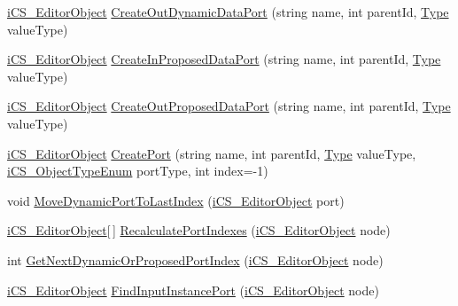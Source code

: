 \begin{DoxyCompactItemize}
\item 
\hyperlink{classi_c_s___editor_object}{i\+C\+S\+\_\+\+Editor\+Object} \hyperlink{classi_c_s___i_storage_a78035f0beb55b7498d9466bbfbcc317b}{Create\+Out\+Dynamic\+Data\+Port} (string name, int parent\+Id, \hyperlink{i_c_s___object_type_enum_8cs_ae6c3dd6d8597380b56d94908eb431547aa1fa27779242b4902f7ae3bdd5c6d508}{Type} value\+Type)
\item 
\hyperlink{classi_c_s___editor_object}{i\+C\+S\+\_\+\+Editor\+Object} \hyperlink{classi_c_s___i_storage_a04b5662bfe2426ee94370f1d87bd4ae5}{Create\+In\+Proposed\+Data\+Port} (string name, int parent\+Id, \hyperlink{i_c_s___object_type_enum_8cs_ae6c3dd6d8597380b56d94908eb431547aa1fa27779242b4902f7ae3bdd5c6d508}{Type} value\+Type)
\item 
\hyperlink{classi_c_s___editor_object}{i\+C\+S\+\_\+\+Editor\+Object} \hyperlink{classi_c_s___i_storage_a919d5f2a4487881a3b76411dc1e337c7}{Create\+Out\+Proposed\+Data\+Port} (string name, int parent\+Id, \hyperlink{i_c_s___object_type_enum_8cs_ae6c3dd6d8597380b56d94908eb431547aa1fa27779242b4902f7ae3bdd5c6d508}{Type} value\+Type)
\item 
\hyperlink{classi_c_s___editor_object}{i\+C\+S\+\_\+\+Editor\+Object} \hyperlink{classi_c_s___i_storage_a0b99a237d2a8840e41d9c73ef0182160}{Create\+Port} (string name, int parent\+Id, \hyperlink{i_c_s___object_type_enum_8cs_ae6c3dd6d8597380b56d94908eb431547aa1fa27779242b4902f7ae3bdd5c6d508}{Type} value\+Type, \hyperlink{i_c_s___object_type_enum_8cs_ae6c3dd6d8597380b56d94908eb431547}{i\+C\+S\+\_\+\+Object\+Type\+Enum} port\+Type, int index=-\/1)
\item 
void \hyperlink{classi_c_s___i_storage_a65d789a13851f11f3208d3c65f1a7cc8}{Move\+Dynamic\+Port\+To\+Last\+Index} (\hyperlink{classi_c_s___editor_object}{i\+C\+S\+\_\+\+Editor\+Object} port)
\item 
\hyperlink{classi_c_s___editor_object}{i\+C\+S\+\_\+\+Editor\+Object}\mbox{[}$\,$\mbox{]} \hyperlink{classi_c_s___i_storage_a535d56ffebe00520a7494f7d663bf1b5}{Recalculate\+Port\+Indexes} (\hyperlink{classi_c_s___editor_object}{i\+C\+S\+\_\+\+Editor\+Object} node)
\item 
int \hyperlink{classi_c_s___i_storage_aaa95749318d25b11f72e201f28a83e3e}{Get\+Next\+Dynamic\+Or\+Proposed\+Port\+Index} (\hyperlink{classi_c_s___editor_object}{i\+C\+S\+\_\+\+Editor\+Object} node)
\item 
\hyperlink{classi_c_s___editor_object}{i\+C\+S\+\_\+\+Editor\+Object} \hyperlink{classi_c_s___i_storage_ae987e8768b814296ab9f39f2c16d6170}{Find\+Input\+Instance\+Port} (\hyperlink{classi_c_s___editor_object}{i\+C\+S\+\_\+\+Editor\+Object} node)

\end{DoxyCompactItemize}
